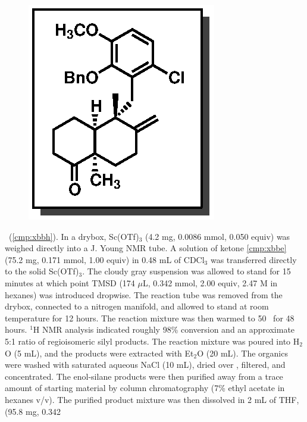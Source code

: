 \vspace{10pt}
\begin{figure}
  \vspace{-25pt}
  \begin{center}
    \includegraphics[scale=0.8]{chp_singlecarbon/images/xbbh}
  \end{center}
  \vspace{-30pt}
\end{figure}\noindent \textbf{\CMPxbbh}\ (\ref{cmp:xbbh}). In a drybox, Sc(OTf)$_3$ (4.2
mg, 0.0086 mmol, 0.050 equiv) was weighed directly into a J. Young NMR
tube. A solution of ketone \ref{cmp:xbbe} (75.2 mg, 0.171 mmol, 1.00 equiv) in
0.48 mL of CDCl$_3$ was transferred directly to the solid Sc(OTf)$_3$. The
cloudy gray suspension was allowed to stand for 15 minutes at which point
TMSD (174 $\mu$L, 0.342 mmol, 2.00 equiv, 2.47 M in hexanes) was introduced dropwise. The
reaction tube was removed from the drybox, connected to a nitrogen manifold, and allowed to
stand at room temperature for 12 hours. The reaction mixture was then warmed to 50 \degc\  for 48
hours. $^1$H NMR analysis indicated roughly 98\% conversion and an approximate 5:1 ratio
of regioisomeric silyl products. The reaction mixture was poured into H$_2$O (5 mL), and the products
were extracted with Et$_2$O (20 mL). The organics were washed with saturated aqueous NaCl (10
mL), dried over , filtered, and concentrated. The enol-silane products were then purified
away from a trace amount of starting material by column chromatography (7\% ethyl acetate in hexanes
v/v). The purified product mixture was then dissolved in 2 mL of THF,  (95.8 mg, 0.342
